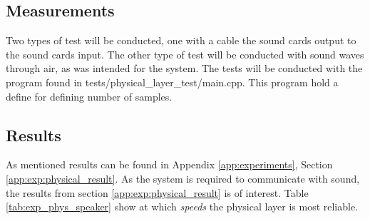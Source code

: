	\subsection{Measurements}
	Two types of test will be conducted, one with a cable the sound cards output to the sound cards input. The other type of test will be conducted with sound waves through air, as was intended for the system.
	The tests will be conducted with the program found in tests/physical\_layer\_test/main.cpp. This program hold a define for defining number of samples.
	
	\subsection{Results}
	As mentioned results can be found in Appendix \ref{app:experiments}, Section \ref{app:exp:physical_result}. As the system is required to communicate with sound, the results from section \ref{app:exp:physical_result} is of interest. Table \ref{tab:exp_phys_speaker} show at which \textit{speeds} the physical layer is most reliable.